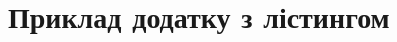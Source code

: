 ﻿%
\chapter[(Довідковий) Приклад додатку з лістингом]{Приклад додатку з лістингом}

\inputminted[breaklines=true]{c}{src/main.cpp}